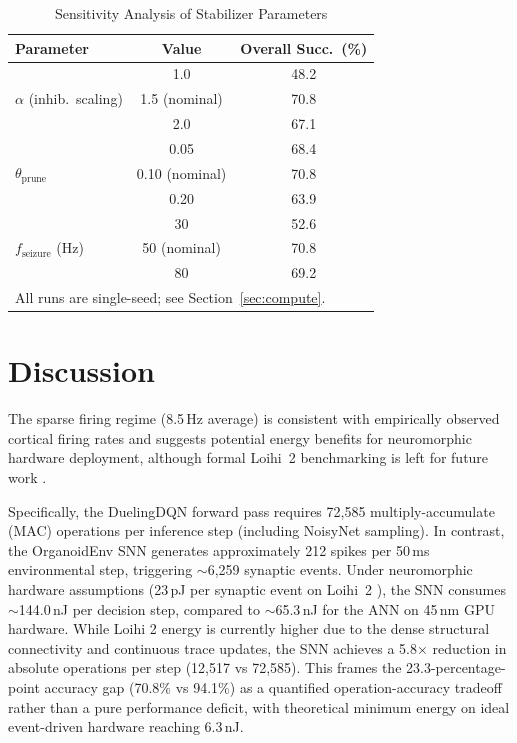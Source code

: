 \documentclass[journal,twocolumn]{IEEEtran}
\begin{document}
\begin{table}[h]
\centering
\renewcommand{\arraystretch}{1.2}
\caption{Sensitivity Analysis of Stabilizer Parameters}
\label{table:sensitivity}
\begin{tabular}{lcc}
\toprule
\textbf{Parameter} & \textbf{Value} & \textbf{Overall Succ.\ (\%)} \\
\midrule
\multirow{3}{*}{$\alpha$ (inhib.\ scaling)}
  & 1.0 & 48.2 \\
  & 1.5 (nominal) & 70.8 \\
  & 2.0 & 67.1 \\
\midrule
\multirow{3}{*}{$\theta_{\mathrm{prune}}$}
  & 0.05 & 68.4 \\
  & 0.10 (nominal) & 70.8 \\
  & 0.20 & 63.9 \\
\midrule
\multirow{3}{*}{$f_{\mathrm{seizure}}$ (Hz)}
  & 30 & 52.6 \\
  & 50 (nominal) & 70.8 \\
  & 80 & 69.2 \\
\bottomrule
\multicolumn{3}{l}{\footnotesize All runs are single-seed;
see Section~\ref{sec:compute}.}
\end{tabular}
\end{table}

\section{Discussion}

The sparse firing regime (8.5\,Hz average) is consistent with
empirically observed cortical firing rates and suggests potential
energy benefits for neuromorphic hardware deployment, although formal
Loihi~2 benchmarking is left for future work \cite{Davies2024Loihi}.

Specifically, the DuelingDQN forward pass requires 72,585 multiply-accumulate 
(MAC) operations per inference step (including NoisyNet sampling). In contrast, 
the OrganoidEnv SNN generates approximately 212 spikes per 50\,ms environmental 
step, triggering $\sim$6,259 synaptic events. Under neuromorphic hardware 
assumptions (23\,pJ per synaptic event on Loihi~2 \cite{Davies2024Loihi}), the 
SNN consumes $\sim$144.0\,nJ per decision step, compared to $\sim$65.3\,nJ for 
the ANN on 45\,nm GPU hardware. While Loihi 2 energy is currently higher due to 
the dense structural connectivity and continuous trace updates, the SNN achieves 
a 5.8$\times$ reduction in absolute operations per step (12,517 vs 72,585). 
This frames the 23.3-percentage-point accuracy gap (70.8\% vs 94.1\%) as a 
quantified operation-accuracy tradeoff rather than a pure performance deficit,
with theoretical minimum energy on ideal event-driven hardware reaching 6.3\,nJ.
\end{document}
